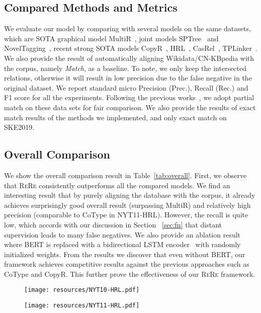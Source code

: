 \documentclass[11pt,a4paper]{article}
\newcommand{\mymethod}[0]{\textsc{ReRe} }
\begin{document}
\subsection{Compared Methods and Metrics}
We evaluate our model by comparing with several models on the same datasets, which are SOTA graphical model MultiR~\cite{Hoffmann2011KnowledgeBasedWS}, joint models  SPTree~\cite{Miwa2016EndtoEndRE} and NovelTagging~\cite{Zheng2017JointEO},
recent strong SOTA models CopyR~\cite{Zeng2018ExtractingRF}, HRL~\cite{Takanobu2019AHF}, CasRel~\cite{Wei2020ANC}, TPLinker~\cite{wang2020tplinker}.
We also provide the result of automatically aligning Wikidata/CN-KBpedia with the corpus, namely \textit{Match}, as a baseline.
To note, we only keep the intersected relations, otherwise it will result in low precision due to the false negative in the original dataset.
We report standard micro Precision (Prec.), Recall (Rec.) and F1 score for all the experiments.
Following the previous works~\cite{Takanobu2019AHF,Wei2020ANC}, we adopt partial match on these data sets for fair comparison. 
We also provide the results of exact match results of the methods we implemented, and only exact match on SKE2019.

\subsection{Overall Comparison}

We show the overall comparison result in Table~\ref{tab:overall}.
First, we observe that \mymethod consistently outperforms all the compared models.
We find an interesting result that by purely aligning the database with the corpus, it already achieves surprisingly good overall result (surpassing MultiR) and relatively high precision (comparable to CoType in NYT11-HRL).
However, the recall is quite low, which accords with our discussion in Section ~\ref{sec:fn} that distant supervision leads to many false negatives.
We also provide an ablation result where BERT is replaced with a bidirectional LSTM encoder~\cite{graves2013speech} with randomly initialized weights.
From the results we discover that even without BERT, our framework achieves competitive results against the previous approaches such as CoType and CopyR.
This further prove the effectiveness of our \mymethod  framework.




\begin{figure*}[!ht]
    \centering
    \begin{subfigure}
        \centering
        \texttt{[image: resources/NYT10-HRL.pdf]}
    \end{subfigure}
\begin{subfigure}
        \centering
        \texttt{[image: resources/NYT11-HRL.pdf]}
    \end{subfigure}
    \caption{Precision-Recall Curve of \mymethod and \textsc{CasRel} under different false negative rate. 
    Lines are better in the upper-right corner than the opposite.
    Note that the coordinates do not starts from 0.}
    \label{fig:pr}
\end{figure*}
\end{document}
